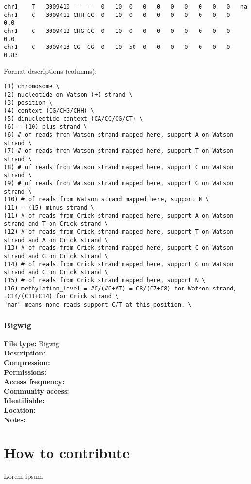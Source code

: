 \documentclass[
]{book}
\begin{document}
\begin{verbatim}
chr1    T   3009410 --  --  0   10  0   0   0   0   0   0   0   0   na
chr1    C   3009411 CHH CC  0   10  0   0   0   0   0   0   0   0   0.0
chr1    C   3009412 CHG CC  0   10  0   0   0   0   0   0   0   0   0.0
chr1    C   3009413 CG  CG  0   10  50  0   0   0   0   0   0   0   0.83
\end{verbatim}

Format descriptions (columns):

\begin{verbatim}
(1) chromosome \
(2) nucleotide on Watson (+) strand \
(3) position \
(4) context (CG/CHG/CHH) \
(5) dinucleotide-context (CA/CC/CG/CT) \
(6) - (10) plus strand \
(6) # of reads from Watson strand mapped here, support A on Watson strand \
(7) # of reads from Watson strand mapped here, support T on Watson strand \
(8) # of reads from Watson strand mapped here, support C on Watson strand \
(9) # of reads from Watson strand mapped here, support G on Watson strand \
(10) # of reads from Watson strand mapped here, support N \
(11) - (15) minus strand \
(11) # of reads from Crick strand mapped here, support A on Watson strand and T on Crick strand \
(12) # of reads from Crick strand mapped here, support T on Watson strand and A on Crick strand \
(13) # of reads from Crick strand mapped here, support C on Watson strand and G on Crick strand \
(14) # of reads from Crick strand mapped here, support G on Watson strand and C on Crick strand \
(15) # of reads from Crick strand mapped here, support N \
(16) methylation_level = #C/(#C+#T) = C8/(C7+C8) for Watson strand, =C14/(C11+C14) for Crick strand \
"nan" means none reads support C/T at this position. \
\end{verbatim}

\hypertarget{bigwig}{%
\subsection{Bigwig}\label{bigwig}}

\textbf{File type:} Bigwig\\
\textbf{Description:}\\
\textbf{Compression:}\\
\textbf{Permissions:}\\
\textbf{Access frequency:}\\
\textbf{Community access:}\\
\textbf{Identifiable:}\\
\textbf{Location:}\\
\textbf{Notes:}

\hypertarget{how-to-contribute}{%
\chapter{How to contribute}\label{how-to-contribute}}

Lorem ipsum

  
\end{document}
